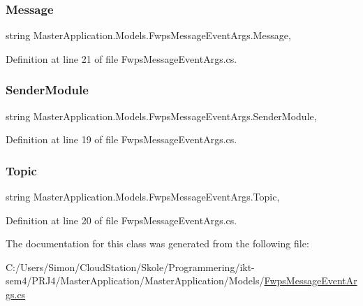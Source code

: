 \subsubsection{\texorpdfstring{Message}{Message}}
{\footnotesize\ttfamily string Master\+Application.\+Models.\+Fwps\+Message\+Event\+Args.\+Message\hspace{0.3cm}{\ttfamily [get]}, {\ttfamily [set]}}



Definition at line 21 of file Fwps\+Message\+Event\+Args.\+cs.

\mbox{\label{class_master_application_1_1_models_1_1_fwps_message_event_args_a03a2b419842db0e8d552a6d72e8c85ca}} 
\subsubsection{\texorpdfstring{Sender\+Module}{SenderModule}}
{\footnotesize\ttfamily string Master\+Application.\+Models.\+Fwps\+Message\+Event\+Args.\+Sender\+Module\hspace{0.3cm}{\ttfamily [get]}, {\ttfamily [set]}}



Definition at line 19 of file Fwps\+Message\+Event\+Args.\+cs.

\mbox{\label{class_master_application_1_1_models_1_1_fwps_message_event_args_aadc403c020e25d21d0996de3a21ba16a}} 
\subsubsection{\texorpdfstring{Topic}{Topic}}
{\footnotesize\ttfamily string Master\+Application.\+Models.\+Fwps\+Message\+Event\+Args.\+Topic\hspace{0.3cm}{\ttfamily [get]}, {\ttfamily [set]}}



Definition at line 20 of file Fwps\+Message\+Event\+Args.\+cs.



The documentation for this class was generated from the following file\+:\begin{DoxyCompactItemize}
\item 
C\+:/\+Users/\+Simon/\+Cloud\+Station/\+Skole/\+Programmering/ikt-\/sem4/\+P\+R\+J4/\+Master\+Application/\+Master\+Application/\+Models/\mbox{\hyperlink{_fwps_message_event_args_8cs}{Fwps\+Message\+Event\+Args.\+cs}}\end{DoxyCompactItemize}
